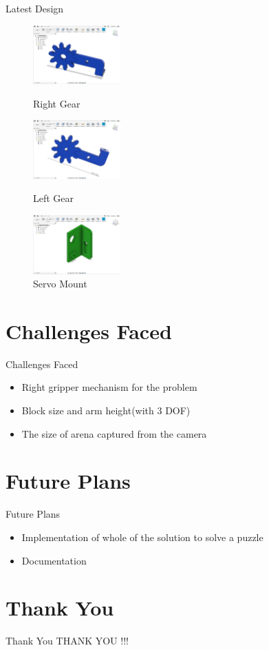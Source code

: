 \documentclass[10pt,a4paper]{beamer}
\begin{document}
\begin{frame}{Latest Design}
\begin{figure}
\includegraphics[height=0.2\textheight, width=0.3\textwidth]{gear1.png}\caption{Right Gear}\includegraphics[height=0.2\textheight, width=0.3\textwidth]{gear2.png}\caption{Left Gear}
\includegraphics[height=0.2\textheight, width=0.3\textwidth]{plate.png}\caption{Servo Mount}
\end{figure}
\end{frame}
\section{Challenges Faced}
\begin{frame}{Challenges Faced}
	\begin{itemize}
		\item Right gripper mechanism for the problem
		\item Block size and arm height(with 3 DOF) 
		\item The size of arena captured from the camera 
	\end{itemize}
\end{frame}

\section{Future Plans}
\begin{frame}{Future Plans}
	\begin{itemize}
		\item Implementation of whole of the solution to solve a puzzle
		\item Documentation
	\end{itemize}
\end{frame}


\section{Thank You}
\begin{frame}{Thank You}
	\centering THANK YOU !!!
\end{frame}
\end{document}
